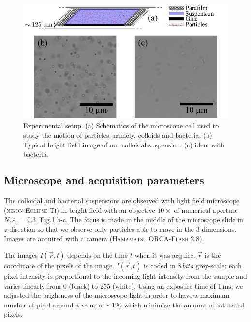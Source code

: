 \documentclass[prb,twocolumn,amsmath,amssymb]{revtex4-1}
\newcommand{\tgn}[1]{{\color{blue}#1}} %
\newlength \figwidth
\begin{document}
\begin{figure}
\includegraphics[width=\figwidth]{Lamelle_Photos.pdf}
\caption{Experimental setup. (a) Schematics of the microscope cell used to study the motion of particles, namely, colloids and bacteria. (b) Typical bright field image of our colloidal suspension. (c) idem with bacteria.}
\label{fig:Slide}
\end{figure}

\subsection{Microscope and acquisition parameters}

The colloidal and bacterial suspensions are observed with light field microscope\cite{Mignard2015} (\textsc{nikon Eclipse Ti}) in bright field with an objective $10 \times$ of numerical aperture $N.A. = 0.3$, Fig.\ref{fig:Slide}.b-c. The focus is made in the middle of the microscope slide in $z$-direction so that we observe only particles able to move in the 3 dimensions. Images are acquired with a camera (\textsc{Hamamatsu ORCA-Flash 2.8}).

\tgn{The images $I(\vec{r}, t)$ depends on the time $t$ when it was acquire. $\vec{r}$ is the coordinate of the pixels of the image}.  $I(\vec{r}, t)$ is coded in $\SI{8}{bits}$  grey-scale: each pixel intensity is proportional to the incoming light intensity from the sample and varies linearly from  0 (black) to 255 (white). Using an exposure time of $\SI{1}{\milli\second}$, we adjusted the brightness of the microscope light in order to have a maximum number of pixel around a value of $\sim 120$ which minimize the amount of saturated pixels.
\end{document}
